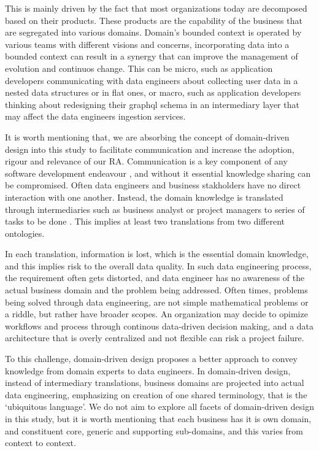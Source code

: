 \documentclass[review]{elsarticle}
\begin{document}
This is mainly driven by the fact that most organizations today are decomposed based on their products. These products are the capability of the business that are segregated into various domains. Domain's bounded context is operated by various teams with different visions and concerns, incorporating data into a bounded context can result in a synergy that can improve the management of evolution and continuos change. This can be micro, such as application developers communicating with data engineers about collecting user data in a nested data structures or in flat ones, or macro, such as application developers thinking about redesigning their graphql schema in an intermediary layer that may affect the data engineers ingestion services.

It is worth mentioning that, we are absorbing the concept of domain-driven design into this study to facilitate communication and increase the adoption, rigour and relevance of our RA. Communication is a key component of any software development endeavour \cite{sudhakar2012model}, and without it essential knowledge sharing can be compromised. Often data engineers and business stakholders have no direct interaction with one another. Instead, the domain knowledge is translated through intermediaries such as business analyst or project managers to series of tasks to be done \cite{khononov2021learning}. This implies at least two translations from two different ontologies. 

In each translation, information is lost, which is the essential domain knowledge, and this implies risk to the overall data quality. In such data engineering process, the requirement often gets distorted, and data engineer has no awareness of the actual business domain and the problem being addressed. Often times, problems being solved through data engineering, are not simple mathematical problems or a riddle, but rather have broader scopes. An organization may decide to opimize workflows and process through continous data-driven decision making, and a data architecture that is overly centralized and not flexible can risk a project failure. 

To this challenge, domain-driven design proposes a better approach to convey knowledge from domain experts to data engineers. In domain-driven design, instead of intermediary translations, business domains are projected into actual data engineering, emphasizing on creation of one shared terminology, that is the `ubiquitous language'. We do not aim to explore all facets of domain-driven design in this study, but it is  worth mentioning that each business has it is  own domain, and constituent core, generic and supporting sub-domains, and this varies from context to context.
\end{document}
